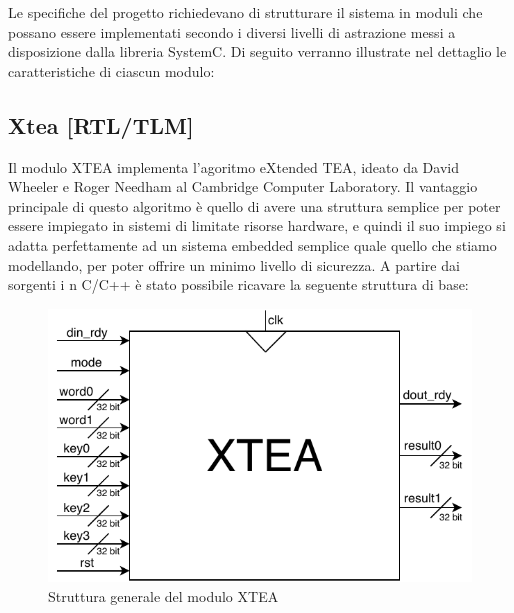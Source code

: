\documentclass[]{IEEEtran}
\begin{document}
Le specifiche del progetto richiedevano di strutturare il sistema in moduli che possano essere implementati secondo i 
diversi livelli di astrazione messi a disposizione dalla libreria SystemC. Di seguito verranno illustrate nel dettaglio 
le caratteristiche di ciascun modulo:

\subsection{Xtea [RTL/TLM]}\label{sec:xtea}
Il modulo XTEA implementa l'agoritmo eXtended TEA, ideato da David Wheeler e Roger Needham al Cambridge Computer 
Laboratory. Il vantaggio principale di questo algoritmo \`e quello di avere una struttura semplice per poter essere 
impiegato in sistemi di limitate risorse hardware, e quindi il suo impiego si adatta perfettamente ad un sistema embedded
semplice quale quello che stiamo modellando, per poter offrire un minimo livello di sicurezza. A partire dai sorgenti i
n C/C++ \`e stato possibile ricavare la seguente struttura di base: 
\begin{figure}[h]
    \centering
    \includegraphics[width=0.7\columnwidth]{figures/xtea.pdf}
	\caption{Struttura generale del modulo XTEA}
    \label{fig:xtea}
\end{figure}
\end{document}
